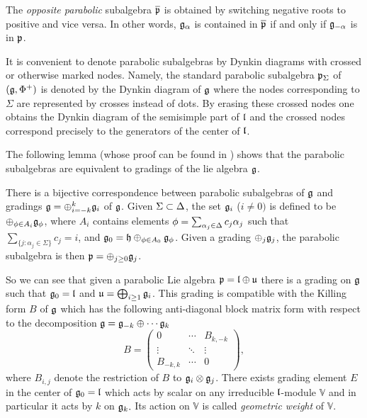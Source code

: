 \documentclass[12pt,a4paper,final]{report}
\begin{document}
The \emph{opposite parabolic} subalgebra $\overline{\mathfrak{p}}$  is obtained by switching negative roots to positive and vice versa. In other words, $\mathfrak{g}_\alpha$ is contained in $\overline{\mathfrak{p}}$ if and only if $\mathfrak{g}_{-\alpha}$ is in $\mathfrak{p}$.

It is convenient to denote parabolic subalgebras by Dynkin diagrams with crossed or otherwise marked nodes. Namely, the standard parabolic subalgebra $\mathfrak{p}_\Sigma$ of $(\mathfrak{g},\Phi^+)$ is denoted by the Dynkin diagram of $\mathfrak{g}$ where the nodes corresponding to $\Sigma$ are represented by crosses instead of dots. By erasing these crossed nodes one obtains the Dynkin diagram of the semisimple part of $\mathfrak{l}$ and the crossed nodes correspond precisely to the generators of the center of $\mathfrak{l}$.

The following lemma (whose proof can be found in \cite{cap_parabolic_2009}) shows that the parabolic subalgebras are equivalent to gradings of the lie algebra $\mathfrak{g}$.
\begin{lemma}
There is a bijective correspondence between parabolic subalgebras of $\mathfrak{g}$ and gradings $\mathfrak{g}=\oplus_{i=-k}^k \mathfrak{g}_i$ of $\mathfrak{g}$.	Given $\Sigma\subset\Delta$, the set $\mathfrak{g}_i$ ($i\neq 0)$ is defined to be $\oplus_{\phi\in A_i} \mathfrak{g}_\phi$, where $A_i$ contains elements $\phi=\sum_{\alpha_j\in\Delta} c_j \alpha_j$ such that $\sum_{\{j:\alpha_j\in\Sigma\}} c_j=i$, and $\mathfrak{g}_0=\mathfrak{h}\oplus_{\phi\in A_0} \mathfrak{g}_\phi$.	Given a grading $\oplus_j \mathfrak{g}_j$, the parabolic subalgebra is then $\mathfrak{p}=\oplus_{j\geq 0}\mathfrak{g}_j$.
\end{lemma}

So we can see that given a parabolic Lie algebra $\mathfrak{p} = \mathfrak{l} \oplus \mathfrak{u}$ there is a grading on $\mathfrak{g}$ such that $\mathfrak{g}_0 = \mathfrak{l}$ and $\mathfrak{u} = \bigoplus_{i \geq 1} \mathfrak{g}_i$. This grading is compatible with the Killing form $B$ of $\mathfrak{g}$ which has the following anti-diagonal block matrix form with respect to the decomposition $\mathfrak{g}=\mathfrak{g}_{-k}\oplus\cdots \mathfrak{g}_k$
\[
 B = \begin{pmatrix}
      0 & \cdots & B_{k,-k} \\
      \vdots &  \ddots & \vdots \\
      B_{-k,k} & \cdots&0
     \end{pmatrix},
\]
where $B_{i,j}$ denote the restriction of $B$ to $\mathfrak{g}_i\otimes \mathfrak{g}_j$. There exists grading element $E$ in the center of $\mathfrak{g}_0 = \mathfrak{l}$ which acts by scalar on any irreducible $\mathfrak{l}$-module $\mathbb{V}$ and in particular it acts by $k$ on $\mathfrak{g}_k.$ Its action on $\mathbb{V}$ is called \emph{geometric weight} of $\mathbb{V}$.
\end{document}
